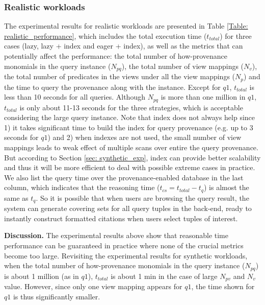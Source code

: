 \subsubsection{Realistic workloads}
\label{ssec: realistic}
The experimental results for realistic workloads are presented in Table \ref{Table: realistic_performance}, which includes the total execution time ($t_{total}$) for three cases (lazy, lazy + index and eager + index), as well as the metrics that can potentially affect the performance: the total number of how-provenance monomials in the query instance ($N_{pq}$), the total number of view mappings ($N_v$), the total number of predicates in the views under all the view mappings ($N_p$) and the time to query the provenance along with the instance. Except for $q1$, $t_{total}$ is less than 10 seconds for all queries. Although $N_{pq}$ is more than one million in $q1$, $t_{total}$ is only about 11-13 seconds for the three strategies, which is acceptable considering the large query instance. Note that index does not always help since 1) it takes significant time to build the index for query provenance (e.g. up to 3 seconds for $q1$) and 2) when indexes are not used, the small number of view mappings leads to weak effect of multiple scans over entire the query provenance. But according to Section \ref{sec: synthetic_exp}, index can provide better scalability and thus it will be more efficient to deal with possible extreme cases in practice. We also list the query time over the provenance-enabled database in the last column, which indicates that the reasoning time ($t_{cs} = t_{total} - t_{q}$) is almost the same as $t_{q}$. So it is possible that when users are browsing the query result, the system can generate covering sets for all query tuples in the back-end, ready to instantly construct formatted citations when users select tuples of interest.


{\bf Discussion.} The experimental results above show that reasonable time performance can be guaranteed in practice where none of the crucial metrics become too large.  Revisiting the experimental results for synthetic workloads, when the total number of how-provenance monomials in the query instance ($N_{pq}$) is about 1 million (as in $q1$), $t_{total}$ is about 1 min in the case of large $N_{pv}$ and $N_v$ value. However, since only one view mapping appears for $q1$, the time shown for $q1$ is thus significantly smaller. 




